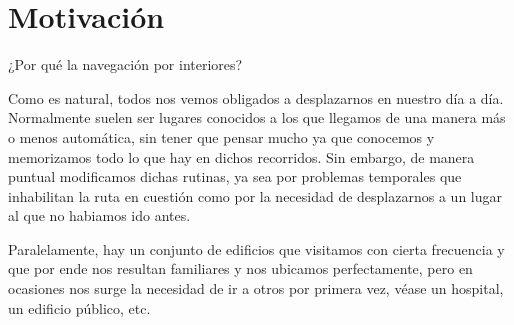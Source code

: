 


\section{Motivación}


	

¿Por qué la navegación por interiores?

Como es natural, todos nos vemos obligados a desplazarnos en nuestro día a día. Normalmente suelen ser lugares conocidos a los que llegamos de una manera más o menos automática, sin tener que pensar mucho ya que conocemos y memorizamos todo lo que hay en dichos recorridos. Sin embargo, de manera puntual modificamos dichas rutinas, ya sea por problemas temporales que inhabilitan la ruta en cuestión como por la necesidad de desplazarnos a un lugar al que no habiamos ido antes.

Paralelamente, hay un conjunto de edificios que visitamos con cierta frecuencia y que por ende nos resultan familiares y nos ubicamos perfectamente, pero en ocasiones nos surge la necesidad de ir a otros por primera vez, véase un hospital, un edificio público, etc. 

